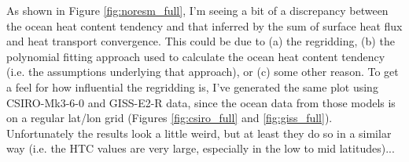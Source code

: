As shown in Figure \ref{fig:noresm_full}, I'm seeing a bit of a discrepancy between the ocean heat content tendency and that inferred by the sum of surface heat flux and heat transport convergence. This could be due to (a) the regridding, (b) the polynomial fitting approach used to calculate the ocean heat content tendency (i.e. the assumptions underlying that approach), or (c) some other reason. To get a feel for how influential the regridding is, I've generated the same plot using CSIRO-Mk3-6-0 and GISS-E2-R data, since the ocean data from those models is on a regular lat/lon grid (Figures \ref{fig:csiro_full} and \ref{fig:giss_full}). Unfortunately the results look a little weird, but at least they do so in a similar way (i.e. the HTC values are very large, especially in the low to mid latitudes)...